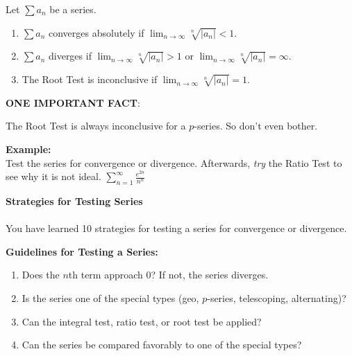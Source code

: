 \documentclass[addpoints, 12pt]{exam}
\begin{document}
\newpage

\begin{tcolorbox}[title= THE ROOT TEST,colframe=black,sharp corners,colback=white,colbacktitle=white,coltitle=black]

    Let
    $\displaystyle\sum a_n$ be a series.
    \begin{enumerate}
        \item $\displaystyle\sum a_n$ converges absolutely if $\displaystyle\lim_{n\to\infty}\sqrt[n]{\left|a_n\right|}<1$.
        \item $\displaystyle\sum a_n$ diverges if $\displaystyle\lim_{n\to\infty}\sqrt[n]{\left|a_n\right|}>1$ or $\displaystyle\lim_{n\to\infty}\sqrt[n]{\left|a_n\right|}=\infty$.
        \item The Root Test is inconclusive if $\displaystyle\lim_{n\to\infty}\sqrt[n]{\left|a_n\right|}=1$.
    \end{enumerate}

\end{tcolorbox}
\vspace{.1in}

\noindent\textbf{ONE IMPORTANT FACT}:
\begin{questions}
    \question The Root Test is always inconclusive for a $p$-series. So don't even bother.
\end{questions}
\vspace{.1in}
\noindent\textbf{Example:}\\
Test the series for convergence or divergence. Afterwards, \textit{try} the Ratio Test to see why it is not ideal.
$\displaystyle\sum_{n=1}^\infty \frac{e^{2n}}{n^n}$


\newpage

\noindent\textbf{\Large Strategies for Testing Series}\\
\\
You have learned 10 strategies for testing a series for convergence or divergence. 

\textbf{Guidelines for Testing a Series:}
\begin{enumerate}
    \item Does the $n$th term approach 0? If not, the series diverges.
    \item Is the series one of the special types (geo, $p$-series, telescoping, alternating)?
    \item Can the integral test, ratio test, or root test be applied?
    \item Can the series be compared favorably to one of the special types?
\end{enumerate}
\end{document}
